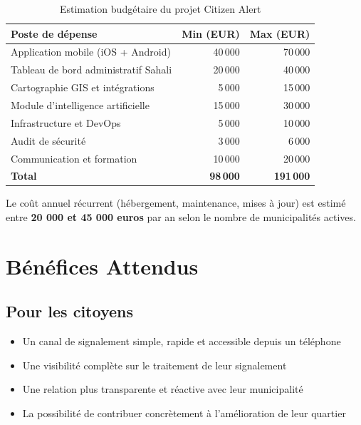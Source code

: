 \documentclass[12pt, a4paper]{article}
\begin{document}
\begin{table}[h!]
\centering
\begin{tabularx}{\textwidth}{Xrr}
\toprule
\textbf{Poste de dépense} & \textbf{Min (EUR)} & \textbf{Max (EUR)} \\
\midrule
Application mobile (iOS + Android)         & 40\,000 & 70\,000 \\
Tableau de bord administratif Sahali       & 20\,000 & 40\,000 \\
Cartographie GIS et intégrations           &  5\,000 & 15\,000 \\
Module d'intelligence artificielle         & 15\,000 & 30\,000 \\
Infrastructure et DevOps                   &  5\,000 & 10\,000 \\
Audit de sécurité                          &  3\,000 &  6\,000 \\
Communication et formation                 & 10\,000 & 20\,000 \\
\midrule
\textbf{Total}                             & \textbf{98\,000} & \textbf{191\,000} \\
\bottomrule
\end{tabularx}
\caption{Estimation budgétaire du projet Citizen Alert}
\end{table}

Le coût annuel récurrent (hébergement, maintenance, mises à jour) est estimé entre \textbf{20 000 et 45 000 euros} par an selon le nombre de municipalités actives.

\section{Bénéfices Attendus}

\subsection{Pour les citoyens}

\begin{itemize}[leftmargin=*]
  \item Un canal de signalement simple, rapide et accessible depuis un téléphone
  \item Une visibilité complète sur le traitement de leur signalement
  \item Une relation plus transparente et réactive avec leur municipalité
  \item La possibilité de contribuer concrètement à l'amélioration de leur quartier
\end{itemize}
\end{document}
